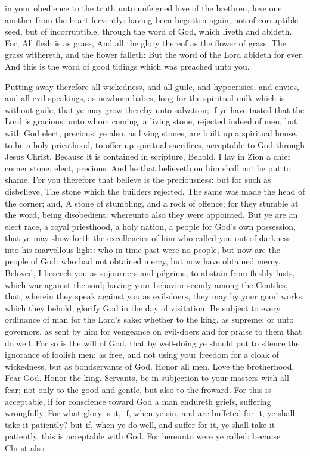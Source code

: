 in your obedience to the truth unto unfeigned love of the brethren, love one another from the heart fervently: having been begotten again, not of corruptible seed, but of incorruptible, through the word of God, which liveth and abideth. For, All flesh is as grass, And all the glory thereof as the flower of grass. The grass withereth, and the flower falleth:  But the word of the Lord abideth for ever. And this is the word of good tidings which was preached unto you. 

Putting away therefore all wickedness, and all guile, and hypocrisies, and envies, and all evil speakings, as newborn babes, long for the spiritual milk which is without guile, that ye may grow thereby unto salvation; if ye have tasted that the Lord is gracious: unto whom coming, a living stone, rejected indeed of men, but with God elect, precious, ye also, as living stones, are built up a spiritual house, to be a holy priesthood, to offer up spiritual sacrifices, acceptable to God through Jesus Christ. Because it is contained in scripture, Behold, I lay in Zion a chief corner stone, elect, precious: And he that believeth on him shall not be put to shame.  For you therefore that believe is the preciousness: but for such as disbelieve, The stone which the builders rejected, The same was made the head of the corner;  and, A stone of stumbling, and a rock of offence; for they stumble at the word, being disobedient: whereunto also they were appointed. But ye are an elect race, a royal priesthood, a holy nation, a people for God’s own possession, that ye may show forth the excellencies of him who called you out of darkness into his marvellous light: who in time past were no people, but now are the people of God: who had not obtained mercy, but now have obtained mercy.  Beloved, I beseech you as sojourners and pilgrims, to abstain from fleshly lusts, which war against the soul; having your behavior seemly among the Gentiles; that, wherein they speak against you as evil-doers, they may by your good works, which they behold, glorify God in the day of visitation.  Be subject to every ordinance of man for the Lord’s sake: whether to the king, as supreme; or unto governors, as sent by him for vengeance on evil-doers and for praise to them that do well. For so is the will of God, that by well-doing ye should put to silence the ignorance of foolish men: as free, and not using your freedom for a cloak of wickedness, but as bondservants of God. Honor all men. Love the brotherhood. Fear God. Honor the king.  Servants, be in subjection to your masters with all fear; not only to the good and gentle, but also to the froward. For this is acceptable, if for conscience toward God a man endureth griefs, suffering wrongfully. For what glory is it, if, when ye sin, and are buffeted for it, ye shall take it patiently? but if, when ye do well, and suffer for it, ye shall take it patiently, this is acceptable with God. For hereunto were ye called: because Christ also 
